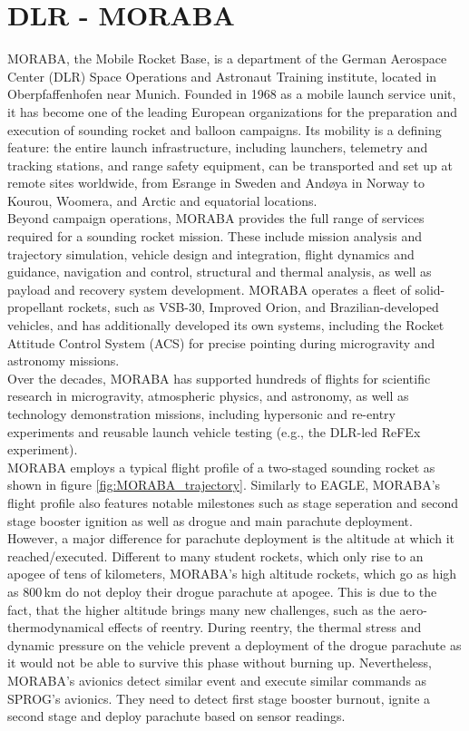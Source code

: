 \documentclass[fontsize=11pt,%
twoside,%
BCOR          = 8mm, %
DIV           = 11,  %
titlepage     = off,%
index=totoc,%
xcolor        = pdftex,%
dvipsnames,%
bibliography  = totoc,%
bibliography = numbered, %
listof        = notnumbered]{scrreprt}
\begin{document}
\section{DLR - MORABA}\label{sec:MORABA}
MORABA, the Mobile Rocket Base, is a department of the German Aerospace Center (DLR) Space Operations and Astronaut Training institute, located in Oberpfaffenhofen near Munich. Founded in 1968 as a mobile launch service unit, it has become one of the leading European organizations for the preparation and execution of sounding rocket and balloon campaigns. Its mobility is a defining feature: the entire launch infrastructure, including launchers, telemetry and tracking stations, and range safety equipment, can be transported and set up at remote sites worldwide, from Esrange in Sweden and Andøya in Norway to Kourou, Woomera, and Arctic and equatorial locations.\\
Beyond campaign operations, MORABA provides the full range of services required for a sounding rocket mission. These include mission analysis and trajectory simulation, vehicle design and integration, flight dynamics and guidance, navigation and control, structural and thermal analysis, as well as payload and recovery system development. MORABA operates a fleet of solid-propellant rockets, such as VSB-30, Improved Orion, and Brazilian-developed vehicles, and has additionally developed its own systems, including the Rocket Attitude Control System (ACS) for precise pointing during microgravity and astronomy missions.\\
Over the decades, MORABA has supported hundreds of flights for scientific research in microgravity, atmospheric physics, and astronomy, as well as technology demonstration missions, including hypersonic and re-entry experiments and reusable launch vehicle testing (e.g., the DLR-led ReFEx experiment)\cite{MORABA}.\\
MORABA employs a typical flight profile of a two-staged sounding rocket as shown in figure \ref{fig:MORABA_trajectory}. Similarly to EAGLE, MORABA's flight profile also features notable milestones such as stage seperation and second stage booster ignition as well as drogue and main parachute deployment. However, a major difference for parachute deployment is the altitude at which it reached/executed. Different to many student rockets, which only rise to an apogee of tens of kilometers, MORABA's high altitude rockets, which go as high as 800\,km do not deploy their drogue parachute at apogee. This is due to the fact, that the higher altitude brings many new challenges, such as the aero-thermodynamical effects of reentry. During reentry, the thermal stress and dynamic pressure on the vehicle prevent a deployment of the drogue parachute as it would not be able to survive this phase without burning up. Nevertheless, MORABA's avionics detect similar event and execute similar commands as SPROG's avionics. They need to detect first stage booster burnout, ignite a second stage and deploy parachute based on sensor readings.
\end{document}
